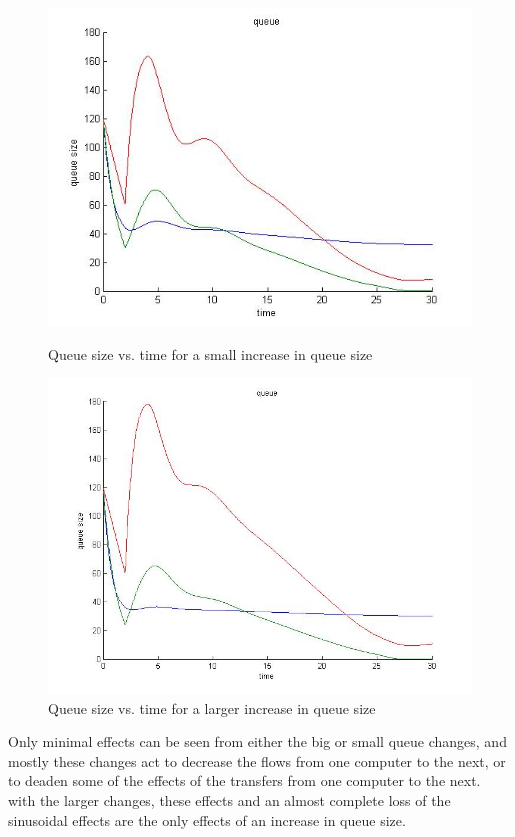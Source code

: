 \documentclass{article}
\begin{document}
\begin{figure}[H]
\begin{center}
\begin{minipage}{0.45\linewidth}
\includegraphics[width=0.95\linewidth]{Queue_size_change.jpg}
\caption{Queue size vs. time for a small increase in queue size }\label{Queue small}
\end{minipage}
\begin{minipage}{0.45\linewidth}
\includegraphics[width=0.95\linewidth]{Queue_size_very_changed.jpg}
\caption{Queue size vs. time for a larger increase in queue size }\label{queue big}
\end{minipage}
\end{center}
\end{figure}

Only minimal effects can be seen from either the big or small queue changes, and mostly these changes act to decrease the flows from one computer to the next, or to deaden some of the effects of the transfers from one computer to the next. with the larger changes, these effects and an almost complete loss of the sinusoidal effects are the only effects of an increase in queue size. 
\end{document}
